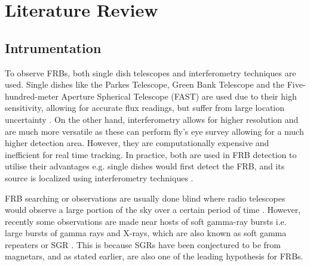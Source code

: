 \chapter{Literature Review}\label{litrev}

\section{Intrumentation}

To observe FRBs, both single dish telescopes and interferometry techniques are used. Single dishes like the Parkes Telescope, Green Bank Telescope and the Five-hundred-meter Aperture Spherical Telescope (FAST) are used due to their high sensitivity, allowing for accurate flux readings, but suffer from large location uncertainty \cite{Keane2016}. On the other hand, interferometry allows for higher resolution and are much more versatile as these can perform fly's eye survey \cite{Shannon2018} allowing for a much higher detection area. However, they are computationally expensive and inefficient for real time tracking. In practice, both are used in FRB detection to utilise their advantages e.g. single dishes would first detect the FRB, and its source is localized using interferometry techniques \cite{Marcote2020}. 

FRB searching or observations are usually done blind where radio telescopes would observe a large portion of the sky over a certain period of time \cite{Keane2017}. However, recently some observations are made near hosts of soft gamma-ray bursts  i.e. large bursts of gamma rays and X-rays, which are also known as soft gamma repeaters or SGR \cite{Madison2019, Katz2020}. This is because SGRs have been conjectured to be from magnetars, and as stated earlier, are also one of the leading hypothesis for FRBs. 



